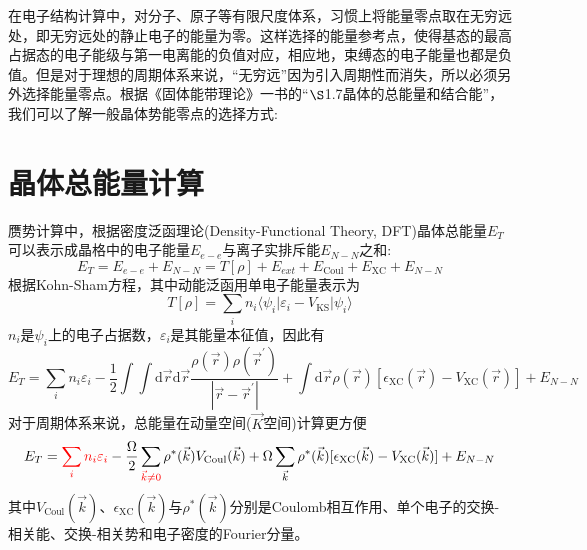 \documentclass{article}      %
\newcommand{\upcite}[1]{\hspace{0ex}\textsuperscript{\cite{#1}}} %
\begin{document}


在电子结构计算中，对分子、原子等有限尺度体系，习惯上将能量零点取在无穷远处，即无穷远处的静止电子的能量为零。这样选择的能量参考点，使得基态的最高占据态的电子能级与第一电离能的负值对应，相应地，束缚态的电子能量也都是负值。但是对于理想的周期体系来说，“无穷远”因为引入周期性而消失，所以必须另外选择能量零点。根据《固体能带理论》\upcite{XIE-LU}一书的“$\S$1.7\;晶体的总能量和结合能”，我们可以了解一般晶体势能零点的选择方式:

\section{晶体总能量计算}
赝势计算中，根据密度泛函理论(\textrm{Density-Functional Theory, DFT})晶体总能量$E_T$可以表示成晶格中的电子能量$E_{e-e}$与离子实排斥能$E_{N-N}$之和:~
	\begin{equation}
		E_T=E_{e-e}+E_{N-N}=T[\rho]+E_{ext}+E_{\mathrm{Coul}}+E_{\mathrm{XC}}+E_{N-N}
		\label{eq:Crystal_ENE_R}
	\end{equation}
根据\textrm{Kohn-Sham}方程，其中动能泛函用单电子能量表示为
\begin{equation}
	T[{\rho}]=\sum_in_i\langle\psi_i|\varepsilon_i-V_{\mathrm{KS}}|\psi_i\rangle
	\label{eq:DFT_Kin}
\end{equation}
$n_i$是$\psi_i$上的电子占据数，$\varepsilon_i$是其能量本征值，因此有
\begin{equation}
	E_T=\sum_in_i\varepsilon_i-\dfrac12\int\int\mathrm{d}\vec r\mathrm{d}\vec r\dfrac{\rho(\vec r)\rho(\vec r^{\prime})}{|\vec r-\vec r^{\prime}|}+\int\mathrm{d}\vec r\rho(\vec r)[\epsilon_{\mathrm{XC}}(\vec r)-V_{\mathrm{XC}}(\vec r)]+E_{N-N}
	\label{eq:DFT_ENE_R}
	\end{equation}
对于周期体系来说，总能量在动量空间($\vec K$空间)计算更方便
\begin{equation}
	E_T=\textcolor{red}{\sum_in_i\varepsilon_i}-\dfrac{\Omega}2\sum_{\textcolor{red}{\vec k\neq 0}}\rho^{\ast}(\vec k)V_{\mathrm{Coul}}(\vec k)+\Omega\sum_{\vec k}\rho^{\ast}(\vec k)[\epsilon_{\mathrm{XC}}(\vec k)-V_{\mathrm{XC}}(\vec k)]+E_{N-N}
	\label{eq:DFT_ENE_G}
\end{equation}
其中$V_{\mathrm{Coul}}(\vec k)$、$\epsilon_{\mathrm{XC}}(\vec k)$与$\rho^{\ast}(\vec k)$分别是\textrm{Coulomb}相互作用、单个电子的交换-相关能、交换-相关势和电子密度的\textrm{Fourier}分量。
\end{document}
